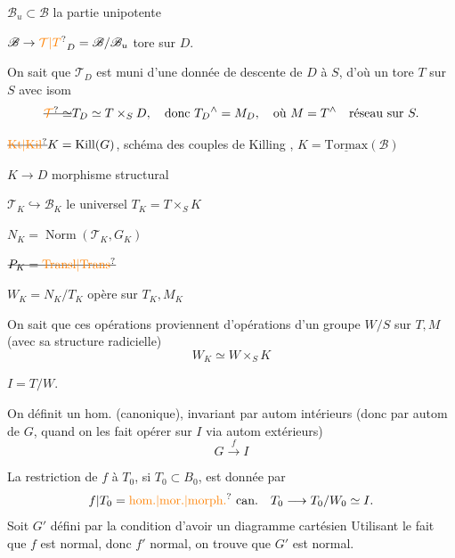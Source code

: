 $\mathscr B_u\subset\mathscr B$ la partie unipotente

$\mathscr B\to \unsure{\mathcal T|T}_D=\mathscr B/\mathscr B_u$ tore sur $D$.

On sait que $\mathcal T_D$ est muni d'une donnée de descente de $D$ à $S$, d'où un tore $T$ sur $S$  avec isom
\[
\deleted{\unsure{\mathcal T}\simeq} T_D\simeq T\times_S D,\quad
\text{donc } T_D{}^\wedge=M_D,\quad\text{où }M=T^\wedge\quad\text{réseau sur }S.
\]

$\deleted{\unsure{\mathrm{Kt}|\mathrm{Kil}}}K=\mathrm{Kill}(G)$, schéma des couples de Killing , $K=\underline{\mathrm{Tormax}}(\mathscr B)$

$K\longrightarrow D$  morphisme structural

$\mathcal T_K\hookrightarrow\mathscr B_K$ le  universel \quad $T_K=T\times_S K$

$N_K=\operatorname{Norm}(\mathcal T_K,G_K)$

$\deleted{P_K=\unsure{\mathrm{Transl}|\mathrm{Trans}}}$

$W_K=N_K/T_K$ opère sur $T_K,M_K$

On sait que ces opérations proviennent d'opérations d'un groupe $W/S$ sur $T,M$ (avec sa structure radicielle)
\[
W_K\simeq W\times_S K
\]

 $I=T/W$.

On définit un  hom. (canonique), invariant par autom intérieurs (donc par  autom de $G$, quand on les fait opérer sur $I$ via autom extérieurs)
\[
G\xrightarrow{f} I
\]

La restriction de $f$ à $T_0$, si $T_0\subset B_0$, est donnée par
\[
f|T_0=\unsure{\text{hom.}|\text{mor.}|\text{morph.}}\ \text{can.}\quad T_0\longrightarrow T_0/W_0\simeq I.
\]
Soit $G'$ défini par la condition d'avoir un diagramme cartésien
Utilisant le fait que $f$ est normal, donc $f'$ normal, on trouve que  $G'$ est normal.

